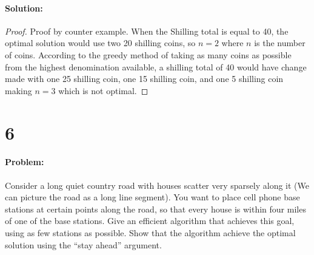 \documentclass[12pt]{article}
\begin{document}
\paragraph{Solution:}
\begin{proof}
Proof by counter example.
When the Shilling total is equal to 40, the optimal solution would use
two 20 shilling coins, so $n=2$ where $n$ is the number of coins.
According to the greedy method of taking as many coins as possible from
the highest denomination available, a shilling total of 40 would have
change made with one 25 shilling coin, one 15 shilling coin, and one 5
shilling coin making $n=3$ which is not optimal.
\end{proof}

\section*{6}
\paragraph{Problem:}
Consider a long quiet country road with houses scatter very sparsely
along it (We can picture the road as a long line segment). You want to
place cell phone base stations at certain points along the road, so that
every house is within four miles of one of the base stations.  Give an
efficient algorithm that achieves this goal, using as few stations as
possible. Show that the algorithm achieve the optimal solution using the
“stay ahead” argument.
\end{document}
